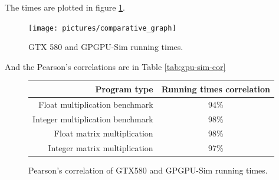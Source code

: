 \documentclass{report}
\begin{document}
        The times are plotted in figure \ref{fig:gpu-sim-corr}.
        \begin{figure}[H]
        \centering
            \texttt{[image: pictures/comparative\_graph]}
            \captionsetup{justification=centering}
            \caption{GTX 580 and GPGPU-Sim running times.}
            \label{fig:gpu-sim-corr}
    \end{figure}

        

        And the Pearson's correlations are in Table \ref{tab:gpu-sim-cor}
        \begin{figure}[H]
        \centering
            \begin{tabular}{ | r | c | }
                \hline
                Program type & Running times correlation \\ \hline
                Float multiplication benchmark & 94\% \\
                Integer multiplication benchmark & 98\% \\
                Float matrix multiplication & 98\% \\
                Integer matrix multiplication & 97\% \\
            \end{tabular}
        \captionsetup{justification=centering}
        \caption{Pearson's correlation of GTX580 and GPGPU-Sim running times.}
        \label{tab:gpu-sim-corr}
        \end{figure}
\end{document}
